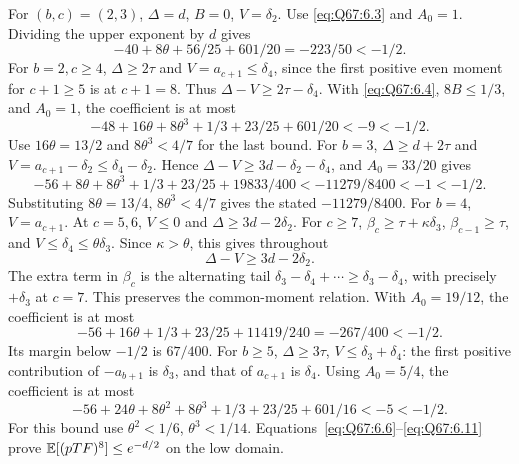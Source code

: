 For \((b,\allowbreak c)=\allowbreak (2,\allowbreak 3)\), \(\Delta=\allowbreak d\), \(B=\allowbreak 0\), \(V=\allowbreak \delta_2\).
Use \eqref{eq:Q67:6.3} and \(A_0=\allowbreak 1\). Dividing the upper exponent
by \(d\) gives
\begin{equation}\tag{Q67.6.6}\label{eq:Q67:6.6}
-40+8\theta+56/25+601/20=-223/50<-1/2.
\end{equation}
For \(b=\allowbreak 2,\allowbreak c\ge\allowbreak 4\), \(\Delta\ge\allowbreak 2\tau\) and
\(V=\allowbreak a_{c+1}\le\allowbreak \delta_4\), since the first positive even moment for
\(c+1\ge\allowbreak 5\) is at \(c+1=\allowbreak 8\). Thus \(\Delta-V\ge\allowbreak 2\tau-\delta_4\).
With \eqref{eq:Q67:6.4}, \(8B\le\allowbreak 1/3\), and \(A_0=\allowbreak 1\), the coefficient is at most
\begin{equation}\tag{Q67.6.7}\label{eq:Q67:6.7}
-48+16\theta+8\theta^3+1/3+23/25+601/20<-9<-1/2.
\end{equation}
Use \(16\theta=\allowbreak 13/2\) and \(8\theta^3<\allowbreak 4/7\) for the last bound.
For \(b=\allowbreak 3\), \(\Delta\ge\allowbreak  d+2\tau\) and
\(V=\allowbreak a_{c+1}-\delta_2\le\allowbreak \delta_4-\delta_2\).
Hence \(\Delta-V\ge\allowbreak 3d-\delta_2-\delta_4\), and \(A_0=\allowbreak 33/20\) gives
\begin{equation}\tag{Q67.6.8}\label{eq:Q67:6.8}
-56+8\theta+8\theta^3+1/3+23/25+19833/400
<-11279/8400<-1<-1/2.
\end{equation}
Substituting \(8\theta=\allowbreak 13/4\), \(8\theta^3<\allowbreak 4/7\) gives the stated
\(-11279/8400\).
For \(b=\allowbreak 4\), \(V=\allowbreak a_{c+1}\). At \(c=\allowbreak 5,\allowbreak 6\), \(V\le\allowbreak 0\) and
\(\Delta\ge\allowbreak 3d-2\delta_2\).
For \(c\ge\allowbreak 7\), \(\beta_c\ge\allowbreak \tau+\kappa\delta_3\),
\(\beta_{c-1}\ge\allowbreak \tau\), and \(V\le\allowbreak \delta_4\le\allowbreak \theta\delta_3\).
Since \(\kappa>\allowbreak \theta\), this gives throughout
\begin{equation}\tag{Q67.6.9}\label{eq:Q67:6.9}
\Delta-V\ge3d-2\delta_2.
\end{equation}
The extra term in \(\beta_c\) is the alternating tail
\(\delta_3-\delta_4+\cdots\ge\allowbreak \delta_3-\delta_4\), with precisely
\(+\delta_3\) at \(c=\allowbreak 7\). This preserves the common-moment relation.
With \(A_0=\allowbreak 19/12\), the coefficient is at most
\begin{equation}\tag{Q67.6.10}\label{eq:Q67:6.10}
-56+16\theta+1/3+23/25+11419/240=-267/400<-1/2.
\end{equation}
Its margin below \(-1/2\) is \(67/400\).
For \(b\ge\allowbreak 5\), \(\Delta\ge\allowbreak 3\tau\), \(V\le\allowbreak \delta_3+\delta_4\):
the first positive contribution of \(-a_{b+1}\) is \(\delta_3\),
and that of \(a_{c+1}\) is \(\delta_4\).
Using \(A_0=\allowbreak 5/4\), the coefficient is at most
\begin{equation}\tag{Q67.6.11}\label{eq:Q67:6.11}
-56+24\theta+8\theta^2+8\theta^3+1/3+23/25+601/16<-5<-1/2.
\end{equation}
For this bound use \(\theta^2<\allowbreak 1/6\), \(\theta^3<\allowbreak 1/14\).
Equations~\eqref{eq:Q67:6.6}--\eqref{eq:Q67:6.11} prove
\(\mathbb E[(pTF)^8]\le\allowbreak  e^{-d/2}\) on the low domain.

